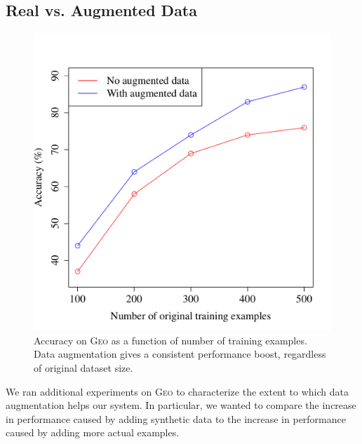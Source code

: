 \documentclass[11pt,letterpaper]{article}
\newcommand{\geo}{\textsc{Geo}\xspace}
\begin{document}

\subsection{Real vs. Augmented Data}
\begin{figure}[t] 
\begin{center} 
  \includegraphics[scale=0.4]{fig-geo-augment.pdf}
\end{center} 
\caption{Accuracy on \geo as a function of number of training examples.
  Data augmentation gives a consistent performance boost,
regardless of original dataset size.}
\label{fig:overview}
\end{figure}

We ran additional experiments on \geo to characterize
the extent to which data augmentation helps our system.
In particular, we wanted to compare the increase in performance
caused by adding synthetic data to the 
increase in performance caused by adding more actual examples.
\end{document}
